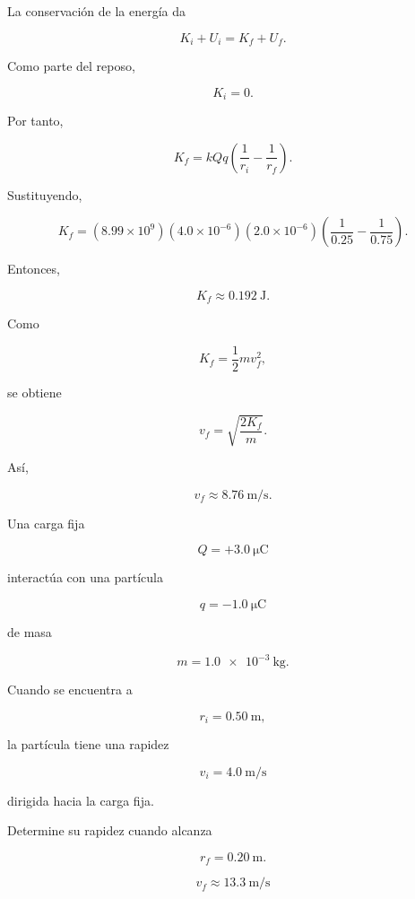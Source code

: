 \begin{explicacion}

La conservación de la energía da

\[
K_i+U_i=K_f+U_f.
\]

Como parte del reposo,

\[
K_i=0.
\]

Por tanto,

\[
K_f
=
kQq
\left(
\frac{1}{r_i}-\frac{1}{r_f}
\right).
\]

Sustituyendo,

\[
K_f
=
(8.99\times10^9)
(4.0\times10^{-6})(2.0\times10^{-6})
\left(
\frac{1}{0.25}
-
\frac{1}{0.75}
\right).
\]

Entonces,

\[
K_f\approx\SI{0.192}{\joule}.
\]

Como

\[
K_f=\frac12mv_f^2,
\]

se obtiene

\[
v_f
=
\sqrt{\frac{2K_f}{m}}.
\]

Así,

\[
\boxed{v_f\approx\SI{8.76}{\metre\per\second}}.
\]

\end{explicacion}


\begin{ejercicio}

Una carga fija

\[
Q=+\SI{3.0}{\micro\coulomb}
\]

interactúa con una partícula

\[
q=-\SI{1.0}{\micro\coulomb}
\]

de masa

\[
m=\SI{1.0e-3}{\kilogram}.
\]

Cuando se encuentra a

\[
r_i=\SI{0.50}{\metre},
\]

la partícula tiene una rapidez

\[
v_i=\SI{4.0}{\metre\per\second}
\]

dirigida hacia la carga fija.

Determine su rapidez cuando alcanza

\[
r_f=\SI{0.20}{\metre}.
\]

\end{ejercicio}

\begin{respuesta}

\[
\boxed{v_f\approx\SI{13.3}{\metre\per\second}}
\]

\end{respuesta}

